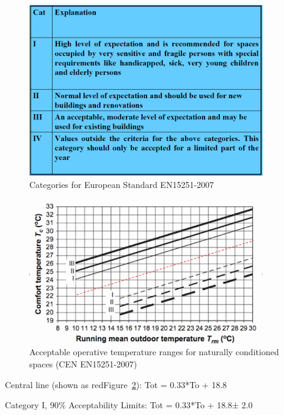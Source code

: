 \begin{figure}[hbtp] %
\centering
\includegraphics[width=0.9\textwidth, height=0.9\textheight, keepaspectratio=true]{media/image6819.png}
\caption{Categories for European Standard EN15251-2007 \protect \label{fig:categories-for-european-standard-en15251-2007}}
\end{figure}

\begin{figure}[hbtp] %
\centering
\includegraphics[width=0.9\textwidth, height=0.9\textheight, keepaspectratio=true]{media/image6820.png}
\caption{Acceptable operative temperature ranges for naturally conditioned spaces (CEN EN15251-2007) \protect \label{fig:acceptable-operative-temperature-ranges-for-001}}
\end{figure}

Central line (shown as redFigure~\ref{fig:acceptable-operative-temperature-ranges-for-001}): Tot = 0.33*To + 18.8

Category I, 90\% Acceptability Limits: Tot = 0.33*To + 18.8± 2.0

